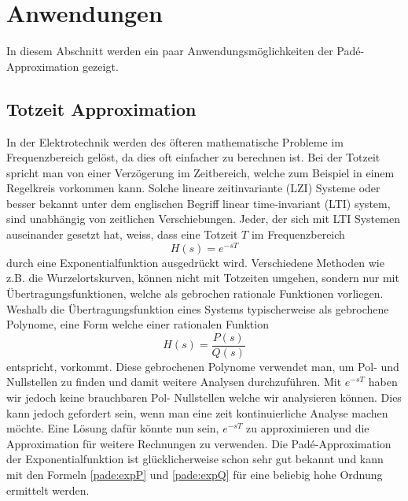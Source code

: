 %
%
%
\section{Anwendungen
\label{pade:section:Anwendungen}}

In diesem Abschnitt werden ein paar Anwendungsmöglichkeiten der Padé-Approximation gezeigt.



\subsection{Totzeit Approximation
\label{pade:subsection:totzeit}}

In der Elektrotechnik werden des öfteren mathematische Probleme im Frequenzbereich gelöst, da dies oft einfacher zu berechnen ist.
Bei der Totzeit spricht man von einer Verzögerung im Zeitbereich, welche zum Beispiel in einem Regelkreis vorkommen kann.
Solche lineare zeitinvariante (LZI) Systeme oder besser bekannt unter dem englischen Begriff linear time-invariant (LTI) system, sind unabhängig von zeitlichen Verschiebungen. 
Jeder, der sich mit LTI Systemen auseinander gesetzt hat, weiss, dass eine Totzeit $T$ im Frequenzbereich
\begin{equation*}
H(s) = e^{-sT}
\end{equation*}
durch eine Exponentialfunktion ausgedrückt wird.
Verschiedene Methoden wie z.B. die Wurzelortskurven, können nicht mit Totzeiten umgehen, sondern nur mit Übertragungsfunktionen, welche als gebrochen rationale Funktionen vorliegen.
Weshalb die Übertragungsfunktion eines Systems typischerweise als gebrochene Polynome, eine Form welche einer rationalen Funktion
\begin{equation*}
H(s)=\frac{P(s)}{Q(s)}
\end{equation*}
entspricht, vorkommt.
Diese gebrochenen Polynome verwendet man, um Pol- und Nullstellen zu finden und damit weitere Analysen durchzuführen. 
Mit $e^{-sT}$ haben wir jedoch keine brauchbaren Pol- Nullstellen welche wir analysieren können.
Dies kann jedoch gefordert sein, wenn man eine zeit kontinuierliche Analyse machen möchte.
Eine Lösung dafür könnte nun sein, $e^{-sT}$ zu approximieren und die Approximation für weitere Rechnungen zu verwenden.
Die Padé-Approximation der Exponentialfunktion ist glücklicherweise schon sehr gut bekannt und kann mit den Formeln \ref{pade:expP} und \ref{pade:expQ} für eine beliebig hohe Ordnung ermittelt werden.

